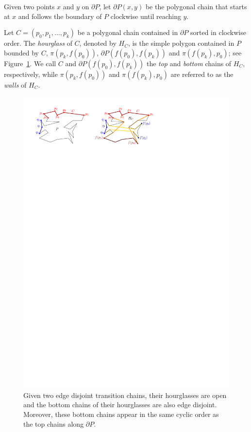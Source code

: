 \documentclass[a4paper,UKenglish]{lipics}
\newcommand{\ff}[1]{\ensuremath{f(#1)}}
\newcommand{\p}[2]{\ensuremath{\pi(#1, #2)}}
\begin{document}
Given two points $x$ and $y$ on $\partial P$, let $\partial P(x,y)$ be the polygonal chain that starts at $x$ and follows the boundary of $P$ clockwise until reaching $y$.

Let $C = (p_0, p_1, \ldots, p_k)$ be a polygonal chain contained in $\partial P$ sorted in clockwise order.
The \emph{hourglass} of $C$, denoted by $H_C$, is the simple polygon contained in $P$ bounded by $C$, $\p{p_k}{\ff{p_0}}$, $\partial P(\ff{p_0}, \ff{p_k})$ and $\p{\ff{p_k}}{ p_0}$; see Figure~\ref{fig:Transition chains and hourglasses}. 
We call $C$ and $\partial P(\ff{p_0}, \ff{p_k})$ the \emph{top} and \emph{bottom} chains of $H_C$, respectively, while $\p{p_k}{ \ff{p_0}}$ and $\p{\ff{p_k}}{p_0}$ are referred to as the \emph{walls} of $H_C$.

\begin{figure}[tb]
\centering
\includegraphics{img/TransitionChains.pdf}
\caption{\small Given two edge disjoint transition chains, their hourglasses are open and
the bottom chains of their hourglasses are also edge disjoint. 
Moreover, these bottom chains appear in the same cyclic order as the top chains along $\partial P$.}
\label{fig:Transition chains and hourglasses}
\end{figure}
\end{document}
